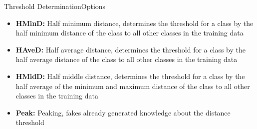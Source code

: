 \begin{frame}{Threshold Determination}{Options}
    \begin{itemize}
        \item \textbf{HMinD:} Half minimum distance, determines the threshold for a class by the
            half minimum distance of the class to all other classes in the training data
        \pause
        \item \textbf{HAveD:} Half average distance, determines the threshold for a class by the
            half average distance of the class to all other classes in the training data
        \pause
        \item \textbf{HMidD:} Half middle distance, determines the threshold for a class by the
            half average of the minimum and maximum distance of the class to all other classes in the training data
        \pause
        \item \textbf{Peak:} Peaking, fakes already generated knowledge about the distance
            threshold
    \end{itemize}
\end{frame}
